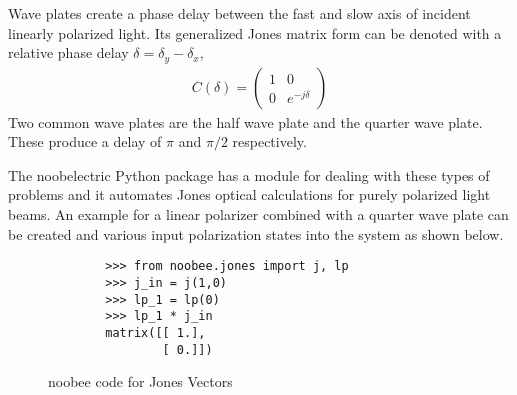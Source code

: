 Wave plates create a phase delay between the fast and slow axis of incident linearly polarized light.  Its generalized Jones matrix form can be denoted with a relative phase delay $\delta=\delta_y-\delta_x$,
\begin{align}
    C(\delta) =
    \begin{pmatrix}
        1 & 0 \\
        0 & e^{-j\delta}
    \end{pmatrix}
\end{align}
%
Two common wave plates are the half wave plate and the quarter wave plate.  These produce a delay of $\pi$ and $\pi/2$ respectively.

The noobelectric Python package has a module for dealing with these types of problems and it automates Jones optical calculations for purely polarized light beams.  An example for a linear polarizer combined with a quarter wave plate can be created and various input polarization states into the system as shown below.
\begin{figure}
    \begin{lstlisting}
        >>> from noobee.jones import j, lp
        >>> j_in = j(1,0)
        >>> lp_1 = lp(0)
        >>> lp_1 * j_in
        matrix([[ 1.],
                [ 0.]])
    \end{lstlisting}
    \caption{noobee code for Jones Vectors}
    \label{fig:scattering}
\end{figure}
